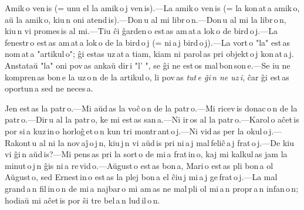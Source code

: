 

Amik\,o ven\,is (= unu el la amik\,o\,j ven\,is).---La amik\,o ven\,is (= la kon\,at\,a amik\,o, aŭ la amik\,o, kiu\,n oni atend\,is).---Don\,u al mi libr\,o\,n.---Don\,u al mi la libr\,o\,n, kiu\,n vi promes\,is al mi.---Tiu ĉi ĝarden\,o est\,as am\,at\,a lok\,o de bird\,o\,j.---La fenestr\,o est\,as am\,at\,a lok\,o de la bird\,o\,j (= ni\,a\,j bird\,o\,j).---La vort\,o "la" est\,as nom\,at\,a "artikul\,o"; ĝi estas uz\,at\,a tiam, kiam ni parol\,as pri objekt\,o\,j kon\,at\,a\,j. Anstataŭ "la" oni pov\,as ankaŭ dir\,i "l' ", se ĝi ne est\,os mal\,bon\,son\,e.---Se iu ne kompren\,as bon\,e la uz\,o\,n de la artikul\,o, li pov\,as \emph{tut\,e ĝi\,n ne uz\,i}, ĉar ĝi est\,as oportun\,a sed ne neces\,a. 



Jen est\,as la patr\,o.---Mi aŭd\,as la voĉ\,o\,n de la patr\,o.---Mi ricev\,is donac\,o\,n de la patr\,o.---Dir\,u al la patr\,o, ke mi est\,as san\,a.---Ni ir\,os al la patr\,o.---Karol\,o aĉet\,is por si\,a kuz\,in\,o horloĝ\,et\,o\,n kun tri montr\,ant\,o\,j.---Ni vid\,as per la okul\,o\,j.---Rakont\,u al ni la nov\,aĵ\,o\,j\,n, kiu\,j\,n vi aŭd\,is pri ni\,a\,j mal\,feliĉ\,a\,j frat\,o\,j.---De kiu vi ĝi\,n aŭd\,is?---Mi pens\,as pri la sort\,o de mi\,a frat\,in\,o, kaj mi kalkul\,as jam la minut\,o\,j\,n ĝis ni\,a re\,vid\,o.---Aŭgust\,o est\,as bon\,a, Mari\,o est\,as pli bon\,a ol Aŭgust\,o, sed Ernest\,in\,o est\,as la plej bon\,a el ĉiu\,j mi\,a\,j ge\,frat\,o\,j.---La mal\,grand\,a\,n fil\,in\,o\,n de mi\,a najbar\,o mi am\,as ne mal\,pli ol mi\,a\,n propr\,a\,n infan\,o\,n; hodiaŭ mi aĉet\,is por ŝi tre bel\,a\,n lud\,il\,o\,n. 



